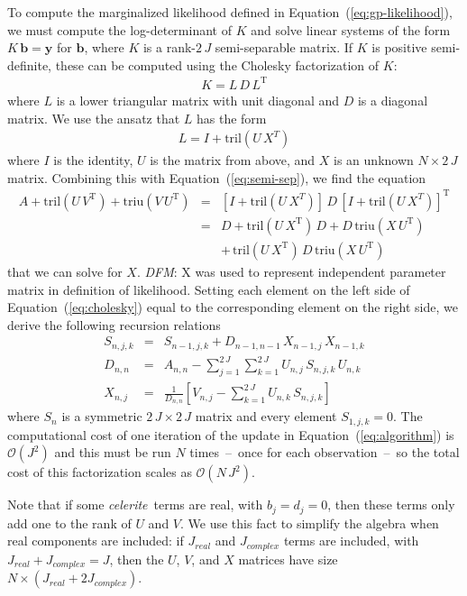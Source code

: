 \documentclass[manuscript, letterpaper]{aastex6}
\newcommand{\celeriteterm}{\emph{celerite}}
\renewcommand{\eqref}[1]{\ref{eq:#1}}
\newcommand{\Eq}[1]{Equation~(\eqref{#1})}
\newcommand{\eq}[1]{\Eq{#1}}
\newcommand{\eqlabel}[1]{\label{eq:#1}}
\newcommand{\T}{\ensuremath{\mathrm{T}}}
\newcommand{\bvec}[1]{{\ensuremath{\boldsymbol{#1}}}}
\newcommand{\todo}[3]{{\color{#2}\emph{#1}: #3}}
\newcommand{\dfmtodo}[1]{\todo{DFM}{red}{#1}}
\begin{document}
To compute the marginalized likelihood defined in \eq{gp-likelihood}, we must
compute the log-determinant of $K$ and solve linear systems of the form
$K\,\bvec{b}=\bvec{y}$ for $\bvec{b}$, where $K$ is a rank-$2\,J$
semi-separable matrix.
If $K$ is positive semi-definite, these can be computed using the Cholesky
factorization of $K$:
\begin{eqnarray}
K = L\,D\,L^\T
\end{eqnarray}
where $L$ is a lower triangular matrix with unit diagonal and $D$ is a
diagonal matrix.
We use the ansatz that $L$ has the form
\begin{eqnarray}
    L = I + \mathrm{tril} (U\,X^T)
\end{eqnarray}
where $I$ is the identity, $U$ is the matrix from above, and $X$ is an unknown
$N \times 2\,J$ matrix.
Combining this with \eq{semi-sep}, we find the equation
\begin{eqnarray}\eqlabel{cholesky}
A + \mathrm{tril}(U\,V^\T) + \mathrm{triu}(V\,U^\T)
&=& \left[I + \mathrm{tril} (U\,X^T)\right]\,D\,
    {\left[I + \mathrm{tril} (U\,X^T)\right]}^\T \\
&=& D + \mathrm{tril}(U\,X^\T)\,D
    + D\,\mathrm{triu}(X\,U^\T) \nonumber\\
&& +\, \mathrm{tril}(U\,X^\T)\,D\,\mathrm{triu}(X\,U^\T) \nonumber
\end{eqnarray}
that we can solve for $X$. \dfmtodo{X was used to represent independent
parameter matrix in definition of likelihood.}
Setting each element on the left side of \eq{cholesky} equal to the
corresponding element on the right side, we derive the following recursion
relations
\begin{eqnarray}
S_{n,j,k} &=& S_{n-1,j,k} + D_{n-1,n-1}\,X_{n-1,j}\,X_{n-1,k} \nonumber\\
D_{n,n} &=& A_{n,n} -
    \sum_{j=1}^{2\,J}\sum_{k=1}^{2\,J} U_{n,j}\,S_{n,j,k}\,U_{n,k}
    \nonumber\\
X_{n,j} &=& \frac{1}{D_{n,n}}\left[ V_{n,j} -
    \sum_{k=1}^{2\,J}U_{n,k}\,S_{n,j,k} \right]
    \eqlabel{algorithm}
\end{eqnarray}
where $S_n$ is a symmetric $2\,J \times 2\,J$ matrix and every element
$S_{1,j,k}=0$.
The computational cost of one iteration of the update in \eq{algorithm} is
$\mathcal{O}(J^2)$ and this must be run $N$ times~--~once for each
observation~--~so the total cost of this factorization scales as
$\mathcal{O}(N\,J^2)$.

Note that if some \celeriteterm\ terms are real, with $b_j=d_j=0$,
then these terms only add one to the rank of $U$ and $V$.  We use this fact
to simplify the algebra when real components are included:  if $J_{real}$
and $J_{complex}$ terms are included, with $J_{real}+J_{complex}=J$, then
the $U$, $V$, and $X$ matrices have size $N \times (J_{real}+2J_{complex})$.
\end{document}
